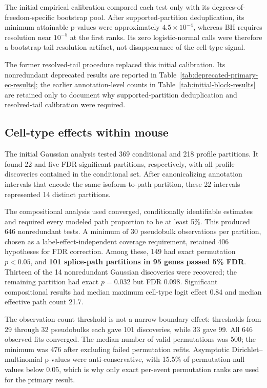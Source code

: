 \documentclass[11pt]{article}
\begin{document}
The initial empirical calibration compared each test only with its degrees-of-freedom-specific bootstrap pool. After supported-partition deduplication, its minimum attainable p-values were approximately $4.5\times10^{-4}$, whereas BH requires resolution near $10^{-5}$ at the first ranks. Its zero logistic-normal calls were therefore a bootstrap-tail resolution artifact, not disappearance of the cell-type signal.

The former resolved-tail procedure replaced this initial calibration. Its nonredundant deprecated results are reported in Table~\ref{tab:deprecated-primary-ec-results}; the earlier annotation-level counts in Table~\ref{tab:initial-block-results} are retained only to document why supported-partition deduplication and resolved-tail calibration were required.

\subsection*{Cell-type effects within mouse}

The initial Gaussian analysis tested 369 conditional and 218 profile partitions. It found 22 and five FDR-significant partitions, respectively, with all profile discoveries contained in the conditional set. After canonicalizing annotation intervals that encode the same isoform-to-path partition, these 22 intervals represented 14 distinct partitions.

The compositional analysis used converged, conditionally identifiable estimates and required every modeled path proportion to be at least 5\%. This produced 646 nonredundant tests. A minimum of 30 pseudobulk observations per partition, chosen as a label-effect-independent coverage requirement, retained 406 hypotheses for FDR correction. Among these, 149 had exact permutation \(p<0.05\), and \textbf{101 splice-path partitions in 95 genes passed 5\% FDR}. Thirteen of the 14 nonredundant Gaussian discoveries were recovered; the remaining partition had exact \(p=0.032\) but FDR 0.098. Significant compositional results had median maximum cell-type logit effect 0.84 and median effective path count 21.7.

The observation-count threshold is not a narrow boundary effect: thresholds from 29 through 32 pseudobulks each gave 101 discoveries, while 33 gave 99. All 646 observed fits converged. The median number of valid permutations was 500; the minimum was 476 after excluding failed permutation refits. Asymptotic Dirichlet--multinomial p-values were anti-conservative, with 15.5\% of permutation-null values below 0.05, which is why only exact per-event permutation ranks are used for the primary result.
\end{document}
